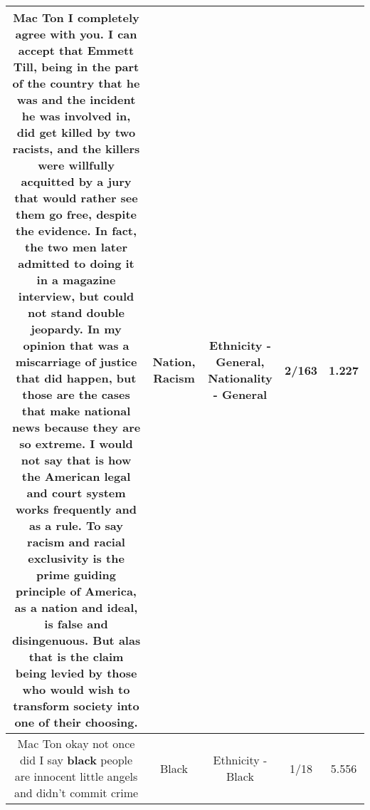 \documentclass[11pt]{article}
\newlength\mylength
\begin{document}
\begin{center}
\begin{longtable}{|C{.65\mylength}|C{.30\mylength}|C{.12\mylength}|C{.12\mylength}|C{.12\mylength}|}
  \small Mac Ton I completely agree with you. I can accept that Emmett Till, being in the part of the country that he was and the incident he was involved in, did get killed by two racists, and the killers were willfully acquitted by a jury that would rather see them go free, despite the evidence. In fact, the two men later admitted to doing it in a magazine interview, but could not stand double jeopardy. In my opinion that was a miscarriage of justice that did happen, but those are the cases that make national news because they are so extreme. I would not say that is how the American legal and court system works frequently and as a rule. To say \textbf{racism} and racial exclusivity is the prime guiding principle of America, as a \textbf{nation} and ideal, is false and disingenuous. But alas that is the claim being levied by those who would wish to transform society into one of their choosing.\normalsize   & Nation, Racism & Ethnicity - General, Nationality - General & 2/163 & 1.227 \\  \hline
  \small Mac Ton okay not once did I say \textbf{black} people are innocent little angels and didn't commit crime\normalsize   & Black & Ethnicity - Black & 1/18 & 5.556 \\  \hline

\end{longtable}
\end{center}
\end{document}
